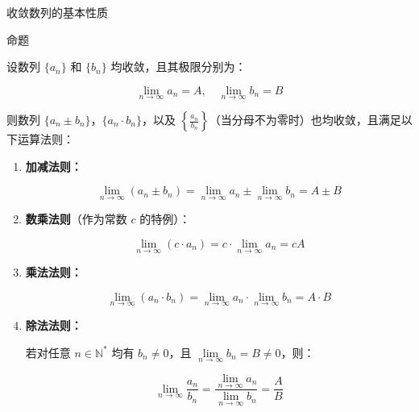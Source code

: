 \documentclass[aspectratio=169,10pt,fontset=fandol]{ctexbeamer}
\begin{document}
\begin{frame}[t,fragile]{收敛数列的基本性质}
\normalsize
\begin{block}{命题}
{\normalsize






设数列 $\{a_n\}$ 和 $\{b_n\}$ 均收敛，且其极限分别为：

\begin{equation*}

	\lim\limits_{n \to \infty} a_n = A, \quad \lim\limits_{n \to \infty} b_n = B

\end{equation*}

则数列 $\{a_n \pm b_n\}$，$\{a_n \cdot b_n\}$，以及 $\left\{\frac{a_n}{b_n}\right\}$（当分母不为零时）也均收敛，且满足以下运算法则：



\begin{enumerate}

	\item \textbf{加减法则：}

	\begin{equation*}

		\lim\limits_{n \to \infty} (a_n \pm b_n) = \lim\limits_{n \to \infty} a_n \pm \lim\limits_{n \to \infty} b_n = A \pm B

	\end{equation*}

	

	\item \textbf{数乘法则}（作为常数 $c$ 的特例）：

	\begin{equation*}

		\lim\limits_{n \to \infty} (c \cdot a_n) = c \cdot \lim\limits_{n \to \infty} a_n = cA

	\end{equation*}

	

	\item \textbf{乘法法则：}

	\begin{equation*}

		\lim_{n \to \infty} (a_n \cdot b_n) = \lim_{n \to \infty} a_n \cdot \lim_{n \to \infty} b_n = A \cdot B

	\end{equation*}

	

	\item \textbf{除法法则：}

	若对任意 $n \in \mathbb{N}^*$ 均有 $b_n \neq 0$，且 $\lim\limits_{n \to \infty} b_n = B \neq 0$，则：

	\begin{equation*}

		\lim_{n \to \infty} \frac{a_n}{b_n} = \frac{\lim\limits_{n \to \infty} a_n}{\lim\limits_{n \to \infty} b_n} = \frac{A}{B}

	\end{equation*}

\end{enumerate}


}
\end{block}
\end{frame}
\end{document}
